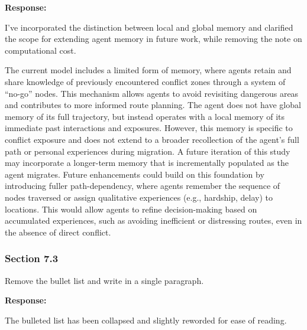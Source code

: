 \documentclass[11pt,a4paper]{article}
\begin{document}
\textbf{Response:}

I've incorporated the distinction between local and global memory and clarified the scope for extending agent memory in future work, while removing the note on computational cost.

\vspace{0.5cm}

\begin{updatebox}

The current model includes a limited form of memory, where agents retain and share knowledge of previously encountered 
conflict zones through a system of “no-go” nodes. This mechanism allows agents to avoid revisiting dangerous areas and 
contributes to more informed route planning. The agent does not have global memory of its full trajectory, but instead 
operates with a local memory of its immediate past interactions and exposures. 
However, this memory is specific to conflict exposure and does not extend 
to a broader recollection of the agent’s full path or personal experiences during migration. 
A future iteration of this study may incorporate a longer-term memory that is incrementally populated as the agent migrates. 
Future enhancements could 
build on this foundation by introducing fuller path-dependency, where agents remember the sequence of nodes traversed or 
assign qualitative experiences (e.g., hardship, delay) to locations. This would allow agents to refine decision-making 
based on accumulated experiences, such as avoiding inefficient or distressing routes, even in the absence of direct 
conflict.

\end{updatebox}

\vspace{0.5cm}

\subsubsection*{Section 7.3}

\begin{reviewbox}
Remove the bullet list and write in a single paragraph.
\end{reviewbox}

\textbf{Response:}

The bulleted list has been collapsed and slightly reworded for ease of reading.

\vspace{0.5cm}
\end{document}

